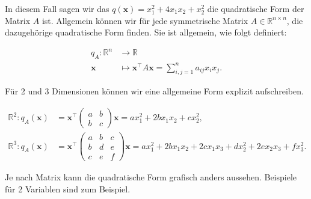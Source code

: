 In diesem Fall sagen wir das \( q(\mathbf{x}) = x_1^2 + 4x_1x_2 + x_2^2 \) die quadratische Form der Matrix \( A \) ist. Allgemein können wir für jede symmetrische Matrix \( A \in \mathbb{R}^{n \times n} \), die dazugehörige quadratische Form finden. Sie ist allgemein, wie folgt definiert:

\begin{equation*}
    \begin{aligned}
        q_A: \mathbb{R}^n &\longrightarrow \mathbb{R} \\
        \mathbf{x} &\longmapsto \mathbf{x}^\top A \mathbf{x} = \sum_{i,j=1}^{n} a_{ij}x_i x_j.
    \end{aligned}
\end{equation*}

Für 2 und 3 Dimensionen können wir eine allgemeine Form explizit aufschreiben. 

\begin{equation*}
    \begin{aligned}
        \mathbb{R}^2: q_A(\mathbf{x}) &= \mathbf{x}^\top \begin{pmatrix} a & b \\ b & c \end{pmatrix} \mathbf{x} = ax_1^2 + 2bx_1x_2 + cx_2^2, \\[1em]
        \mathbb{R}^3: q_A(\mathbf{x}) &= \mathbf{x}^\top \begin{pmatrix} a & b & c \\ b & d & e \\ c & e & f \end{pmatrix} \mathbf{x} = ax_1^2 + 2bx_1x_2 + 2cx_1x_3 + dx_2^2 + 2ex_2x_3 + fx_3^2.
    \end{aligned}
\end{equation*}

\vspace{0.25\baselineskip}

Je nach Matrix kann die quadratische Form grafisch anders aussehen. Beispiele für 2 Variablen sind zum Beispiel.

